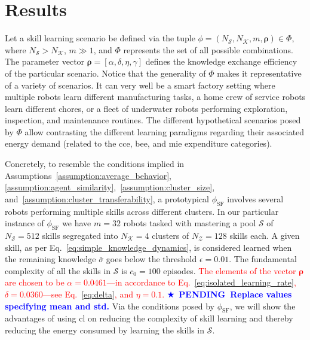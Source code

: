 \documentclass[12pt]{article}
\newcommand\myhl[1]{\textcolor{red}{#1}}
\newcommand*{\pending}[1]{\textcolor{blue}{$\bigstar$~\textbf{PENDING~#1}}}
\begin{document}
\section*{Results}\label{sec_use_case}
Let a skill learning scenario be defined via the tuple $\phi = \left(N_\mathcal{S}, N_\mathcal{K}, m, \bm{\rho} \right) \in \Phi$, where $N_\mathcal{S} > N_\mathcal{K}$, $m \gg 1$, and $\Phi$ represents the set of all possible combinations. The parameter vector $\bm{\rho} = \left[\alpha, \delta, \eta,  \gamma\right]$ defines the knowledge exchange efficiency of the particular scenario. Notice that the generality of $\Phi$ makes it representative of a variety of scenarios. It can very well be a smart factory setting where multiple robots learn different manufacturing tasks, a home crew of service robots learn different chores, or a fleet of underwater robots performing exploration, inspection, and maintenance routines. The different hypothetical scenarios posed by $\Phi$ allow contrasting the different learning paradigms regarding their associated energy demand (related to the \ac{cce}, \ac{bee}, and \ac{mie} expenditure categories).
	
Concretely, to resemble the conditions implied in Assumptions~\ref{assumption:average_behavior}, \ref{assumption:agent_similarity},~\ref{assumption:cluster_size}, and~\ref{assumption:cluster_transferability}, a prototypical $\phi_\text{SF}$ involves several robots performing multiple skills across different clusters. In our particular instance of $\phi_\text{SF}$ we have $m=32$ robots tasked with mastering a pool $\mathcal{S}$ of $N_\mathcal{S}= 512$ skills segregated into $N_\mathcal{K}=4$ clusters of $N_\mathcal{Z} = 128$ skills each. A given skill, as per Eq.~\eqref{eq:simple_knowledge_dynamics}, is considered learned when the remaining knowledge $\bar{\sigma}$ goes below the threshold $\epsilon = 0.01$. The fundamental complexity of all the skills in $\mathcal{S}$ is $c_0 = 100$ episodes. \myhl{The elements of the vector $\bm{\rho}$ are chosen to be $\alpha =  0.0461$---in accordance to Eq.~\eqref{eq:isolated_learning_rate}, $\delta =  0.0360$---see Eq.~\eqref{eq:delta}, and $\eta= 0.1$.} \pending{Replace values specifying mean and std.} Via the conditions posed by $ \phi_\text{SF}$, we will show the advantages of using \ac{cl} on reducing the complexity of skill learning and thereby reducing the energy consumed by learning the skills in $\mathcal{S} $.
\end{document}
